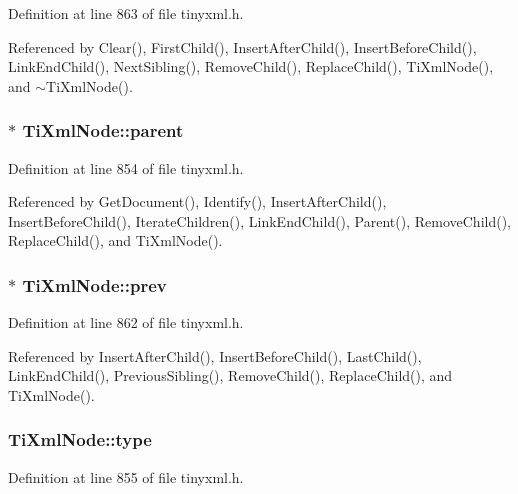 Definition at line 863 of file tinyxml.h.

Referenced by Clear(), FirstChild(), InsertAfterChild(), InsertBeforeChild(), LinkEndChild(), NextSibling(), RemoveChild(), ReplaceChild(), TiXmlNode(), and $\sim$TiXmlNode().\hypertarget{class_ti_xml_node_a662c4de61244e4fa5bd4e2d8c63143a5}{
\subsubsection[{parent}]{$\ast$ {\bf TiXmlNode::parent}}}
\label{class_ti_xml_node_a662c4de61244e4fa5bd4e2d8c63143a5}


Definition at line 854 of file tinyxml.h.

Referenced by GetDocument(), Identify(), InsertAfterChild(), InsertBeforeChild(), IterateChildren(), LinkEndChild(), Parent(), RemoveChild(), ReplaceChild(), and TiXmlNode().\hypertarget{class_ti_xml_node_a9c5370ea2cbfd9f0e0f7b30a57fd68f5}{
\subsubsection[{prev}]{$\ast$ {\bf TiXmlNode::prev}}}
\label{class_ti_xml_node_a9c5370ea2cbfd9f0e0f7b30a57fd68f5}


Definition at line 862 of file tinyxml.h.

Referenced by InsertAfterChild(), InsertBeforeChild(), LastChild(), LinkEndChild(), PreviousSibling(), RemoveChild(), ReplaceChild(), and TiXmlNode().\hypertarget{class_ti_xml_node_a2619c6379181c16ba95ae6922e2ca839}{
\subsubsection[{type}]{ {\bf TiXmlNode::type}}}
\label{class_ti_xml_node_a2619c6379181c16ba95ae6922e2ca839}


Definition at line 855 of file tinyxml.h.

